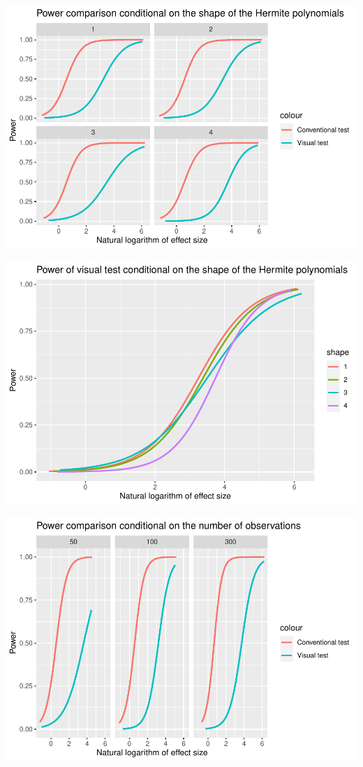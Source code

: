 \documentclass[]{interact}
\theoremstyle{plain}%
\theoremstyle{definition}
\theoremstyle{remark}
\begin{document}
\includegraphics{paper_comparison_files/figure-latex/power-vs-log-effect-size-given-shape-1.pdf}

\includegraphics{paper_comparison_files/figure-latex/power-of-visual-test-given-shape-1.pdf}

\includegraphics{paper_comparison_files/figure-latex/power-vs-log-effect-size-given-number-of-observations-1.pdf}
\end{document}
